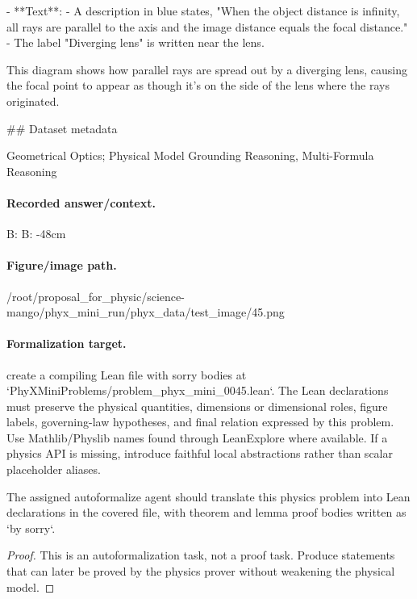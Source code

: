 - **Text**:
  - A description in blue states, "When the object distance is infinity, all rays are parallel to the axis and the image distance equals the focal distance."
  - The label "Diverging lens" is written near the lens. 

This diagram shows how parallel rays are spread out by a diverging lens, causing the focal point to appear as though it's on the side of the lens where the rays originated.

\#\# Dataset metadata

Geometrical Optics; Physical Model Grounding Reasoning, Multi-Formula Reasoning

\paragraph{Recorded answer/context.}
B: B: -48cm

\paragraph{Figure/image path.}
/root/proposal\_for\_physic/science-mango/phyx\_mini\_run/phyx\_data/test\_image/45.png

\paragraph{Formalization target.}
create a compiling Lean file with sorry bodies at `PhyXMiniProblems/problem\_phyx\_mini\_0045.lean`. The Lean declarations must preserve the physical quantities, dimensions or dimensional roles, figure labels, governing-law hypotheses, and final relation expressed by this problem.
Use Mathlib/Physlib names found through LeanExplore where available. If a physics API is missing, introduce faithful local abstractions rather than scalar placeholder aliases.

\begin{theorem}
\label{thm:physics:phyx_mini_0045:target}
The assigned autoformalize agent should translate this physics problem into Lean declarations in the covered file, with theorem and lemma proof bodies written as `by sorry`.
\end{theorem}
\begin{proof}
This is an autoformalization task, not a proof task. Produce statements that can later be proved by the physics prover without weakening the physical model.
\end{proof}

